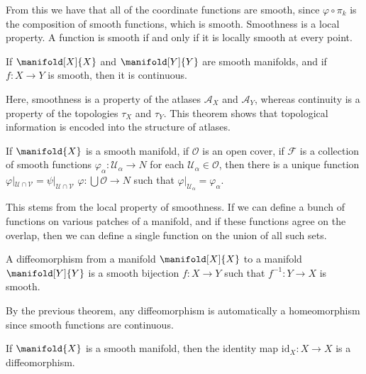 \documentclass{article}                                                        %
\begin{document}
            From this we have that all of the coordinate functions are smooth,
            since $\varphi\circ\pi_{k}$ is the composition of smooth functions,
            which is smooth. Smoothness is a local property. A function is
            smooth if and only if it is locally smooth at every point.
            \begin{theorem}
                If $\manifold[X]{X}$ and $\manifold[Y]{Y}$ are smooth manifolds,
                and if $f:X\rightarrow{Y}$ is smooth, then it is continuous.
            \end{theorem}
            Here, smoothness is a property of the atlases $\mathcal{A}_{X}$ and
            $\mathcal{A}_{Y}$, whereas continuity is a property of the
            topologies $\tau_{X}$ and $\tau_{Y}$. This theorem shows that
            topological information is encoded into the structure of atlases.
            \begin{theorem}
                If $\manifold{X}$ is a smooth manifold, if $\mathcal{O}$ is an
                open cover, if $\mathcal{F}$ is a collection of smooth functions
                $\varphi_{\alpha}:\mathcal{U}_{\alpha}\rightarrow{N}$ for each
                $\mathcal{U}_{\alpha}\in\mathcal{O}$, then there is a unique
                function $\varphi|_{\mathcal{U}\cap\mathcal{V}}=%
                \psi|_{\mathcal{U}\cap\mathcal{V}}$
                $\varphi:\bigcup\mathcal{O}\rightarrow{N}$ such that
                $\varphi|_{\mathcal{U}_{\alpha}}=\varphi_{\alpha}$.
            \end{theorem}
            This stems from the local property of smoothness. If we can define
            a bunch of functions on various patches of a manifold, and if these
            functions agree on the overlap, then we can define a single function
            on the union of all such sets.
            \begin{definition}
                A diffeomorphism from a manifold $\manifold[X]{X}$ to a manifold
                $\manifold[Y]{Y}$ is a smooth bijection $f:X\rightarrow{Y}$
                such that $f^{\minus{1}}:Y\rightarrow{X}$ is smooth.
            \end{definition}
            By the previous theorem, any diffeomorphism is automatically a
            homeomorphism since smooth functions are continuous.
            \begin{theorem}
                If $\manifold{X}$ is a smooth manifold, then the identity map
                $\textrm{id}_{X}:X\rightarrow{X}$ is a diffeomorphism.
            \end{theorem}
\end{document}
